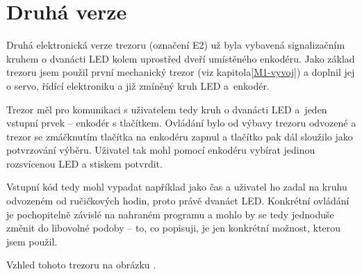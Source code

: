 \section{Druhá verze}
\label{E2-vyvoj}
Druhá elektronická verze trezoru (označení E2) už byla vybavená signalizačním kruhem o dvanácti LED kolem uprostřed dveří
umístěného enkodéru. Jako základ trezoru jsem použil první mechanický trezor (viz kapitola\ref{M1-vyvoj})
a doplnil jej o servo, řídící elektroniku a již zmíněný kruh LED a~enkodér.

Trezor měl pro komunikaci s uživatelem tedy kruh o dvanácti LED a~jeden vstupní prvek -- enkodér s tlačítkem.
Ovládání bylo od výbavy trezoru odvozené a trezor se zmáčknutím tlačítka na enkodéru zapnul a tlačítko pak dál sloužilo jako potvrzování výběru.
Uživatel tak mohl pomocí enkodéru vybírat jedinou rozsvícenou LED a stiskem potvrdit. 

Vstupní kód tedy mohl vypadat 
například jako čas a uživatel ho zadal na kruhu odvozeném od ručičkových hodin, proto právě dvanáct LED.
Konkrétní ovládání je pochopitelně závislé na nahraném programu a mohlo by se tedy jednoduše změnit do libovolné podoby --
to, co popisuji, je jen konkrétní možnost, kterou jsem použil. 

Vzhled tohoto trezoru na obrázku .